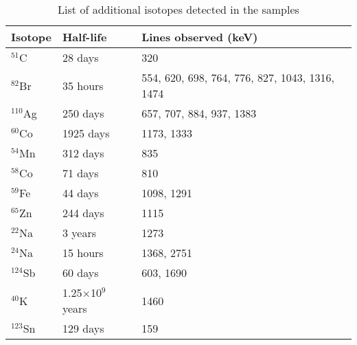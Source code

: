 












\begin{table}
	\centering	
	\begin{tabular} { | l | l | l |}
	\hline
	\textbf{Isotope} & \textbf{Half-life} & \textbf{Lines observed (keV)} \\ \hline
	$^{51}$C & 28 days &  320 \\ \hline
	$^{82}$Br & 35 hours & 554, 620, 698, 764, 776, 827, 1043, 1316, 1474  \\ \hline
	$^{110}$Ag & 250 days & 657, 707, 884, 937, 1383 \\ \hline
	$^{60}$Co & 1925 days & 1173, 1333 \\ \hline
	$^{54}$Mn & 312 days & 835 \\ \hline
	$^{58}$Co & 71 days & 810 \\ \hline
	$^{59}$Fe & 44 days & 1098, 1291 \\ \hline
	$^{65}$Zn & 244 days & 1115 \\ \hline
	$^{22}$Na & 3 years & 1273 \\ \hline
	$^{24}$Na & 15 hours & 1368, 2751 \\ \hline
	$^{124}$Sb & 60 days & 603, 1690 \\ \hline
	$^{40}$K & 1.25$\times$10$^9$ years & 1460 \\ \hline
	$^{123}$Sn & 129 days & 159 \\ \hline
	\end{tabular}
	\caption{List of additional isotopes detected in the samples}
	\label{List of additional isotopes detected in the samples}
\end{table}












